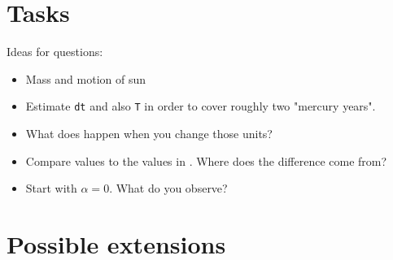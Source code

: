 \documentclass[12pt, UK english]{iopart}
\begin{document}
\section{Tasks}\label{sec:tasks}
Ideas for questions:
\begin{itemize}
	\item Mass and motion of sun
	\item Estimate \texttt{dt} and also \texttt{T} in order to cover roughly two "mercury years".
	\item What does happen when you change those units?
	\item Compare values to the values in \cite{}.  Where does the difference come from?
	\item Start with $\alpha=0$. What do you observe?
\end{itemize}



\section{Possible extensions}\label{sec:extensions}
\end{document}
